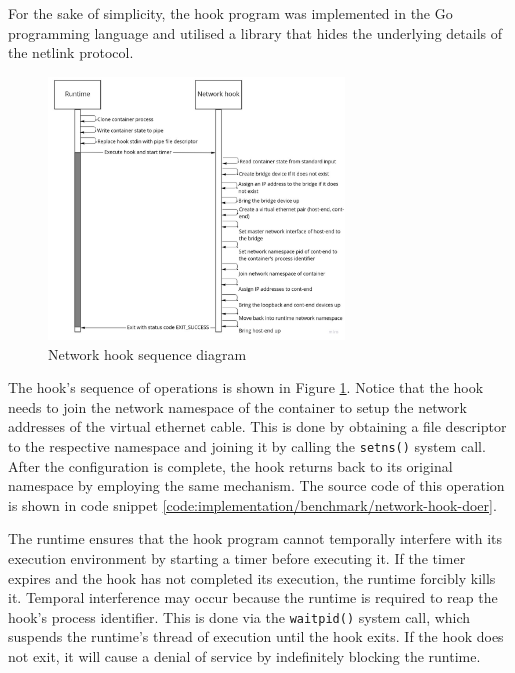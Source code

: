 For the sake of simplicity, the hook program was implemented in the Go programming language 
and utilised a library that hides the underlying details of the netlink protocol.

\begin{figure}[H]
    \centering
    \includegraphics[width=0.7\textwidth]{images/implementation/network-hook-sequence-diagram.jpg}
    \caption{Network hook sequence diagram}
    \label{images:implementation/network-hook-sequence-diagram.jpg}
\end{figure}

The hook's sequence of operations is shown in Figure \ref{images:implementation/network-hook-sequence-diagram.jpg}.
Notice that the hook needs to join the network namespace of the container to setup the network 
addresses of the virtual ethernet cable.
This is done by obtaining a file descriptor to the respective namespace and joining it by 
calling the \verb|setns()| system call. After the configuration is complete, the hook 
returns back to its original namespace by employing the same mechanism. 
The source code of this operation is shown in code snippet \ref{code:implementation/benchmark/network-hook-doer}.

The runtime ensures that the hook program cannot temporally interfere with its execution environment 
by starting a timer before executing it. If the timer expires and the hook has not completed 
its execution, the runtime forcibly kills it. Temporal interference may occur because the runtime 
is required to reap the hook's process identifier. This is done via the \verb|waitpid()| system call,
which suspends the runtime's thread of execution until the hook exits. If the hook does not exit,
it will cause a denial of service by indefinitely blocking the runtime.

